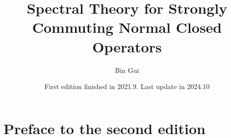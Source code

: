\documentclass[12pt,b5paper,notitlepage]{article}
\title{Spectral Theory for Strongly Commuting Normal Closed Operators}
\author{{\sc Bin Gui}
}
\date{\footnotesize First edition finished in  2021.9. Last update in 2024.10}
\theoremstyle{definition}
\theoremstyle{plain}
\numberwithin{equation}{section}
\begin{document}
\sloppy %
	
	
	
	\maketitle
	
	
\newcommand\blfootnote[1]{%
	\begingroup
	\renewcommand\thefootnote{}\footnote{#1}%
	\addtocounter{footnote}{-1}%
	\endgroup
}

\vspace{-0.5cm}








\makeatletter
\newcommand*{\toccontents}{}
\makeatother
\toccontents



	
	
	
	

	
	

	
	
	
	
	
	
	
	
	

	
\newpage

\section*{Preface to the second edition}
\end{document}
